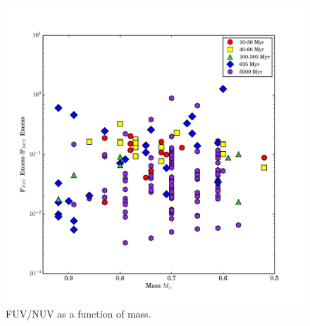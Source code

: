 \documentclass[twocolumn]{aastex62}
\begin{document}
\begin{figure}[t]
\centering
\includegraphics[width=\linewidth]{fuv_nuv_vs_mass_NO_J.pdf}
\caption{FUV/NUV as a function of mass. \label{fig:fuv_nuv_vs_mass}}
\end{figure}
\end{document}
